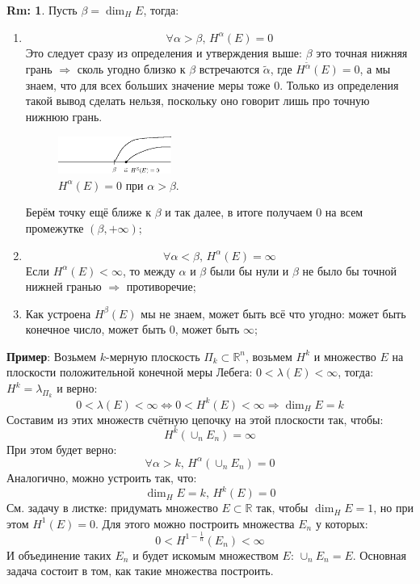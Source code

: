 \documentclass[12pt]{article}
\newcommand{\MR}{\mathbb{R}}
\theoremstyle{definition}
\newtheorem{rem}{Rm:}
\newcommand{\wte}[1]{\widetilde{#1}}
\begin{document}
\begin{rem}
	Пусть $\beta = \dim_H{E}$, тогда:
	\begin{enumerate}[label = \arabic*)]
		\item 
		$$
			\forall \alpha > \beta, \, H^\alpha(E) = 0
		$$ 
		Это следует сразу из определения и утверждения выше: $\beta$ это точная нижняя грань $\Rightarrow$ сколь угодно близко к $\beta$ встречаются $\wte{\alpha}$, где $H^{\wte{\alpha}}(E) = 0$, а мы знаем, что для всех больших значение меры тоже $0$. Только из определения такой вывод сделать нельзя, поскольку оно говорит лишь про точную нижнюю грань.
		\begin{figure}[H]
			\centering
			\includegraphics[width=0.35\textwidth]{MA4L15_1.eps}
			\caption{$H^{\alpha}(E) = 0$ при $\alpha > \beta$.}
			\label{15_1}
		\end{figure}
		Берём точку ещё ближе к $\beta$ и так далее, в итоге получаем $0$ на всем промежутке $(\beta,  +\infty)$;
		\item 
		$$
			\forall \alpha < \beta, \, H^\alpha(E) = \infty
		$$ 
		Если $H^\alpha(E) < \infty$, то между $\alpha$ и $\beta$ были бы нули и $\beta$ не было бы точной нижней гранью $\Rightarrow$ противоречие;
		\item Как устроена $H^\beta(E)$ мы не знаем, может быть всё что угодно: может быть конечное число, может быть $0$, может быть $\infty$;
	\end{enumerate}
\end{rem}

\textbf{Пример}: Возьмем $k$-мерную плоскость $\Pi_k \subset \MR^n$, возьмем $H^k$ и множество $E$ на плоскости положительной конечной меры Лебега: $0 < \lambda(E) < \infty$, тогда: $H^k = \lambda_{\Pi_k}$ и верно:
$$
	0 < \lambda(E) < \infty \Leftrightarrow 0 < H^k(E) < \infty \Rightarrow \dim_H E = k
$$
Составим из этих множеств счётную цепочку на этой плоскости так, чтобы: 
$$
	H^k(\cup_n E_n) = \infty
$$ 
При этом будет верно:
$$
	\forall \alpha > k, \, H^\alpha(\cup_n E_n) = 0
$$
Аналогично, можно устроить так, что: 
$$
	\dim_H E = k, \, H^k(E) = 0
$$ 
См. задачу в листке: придумать множество $E \subset \MR$ так, чтобы $\dim_H{E} =1$, но при этом $H^1(E) = 0$. Для этого можно построить множества $E_n$ у которых:
$$
	0 < H^{1 - \tfrac{1}{n}}(E_n) < \infty
$$
И объединение таких $E_n$ и будет искомым множеством $E$: $\cup_n E_n = E$. Основная задача состоит в том, как такие множества построить.
\end{document}

